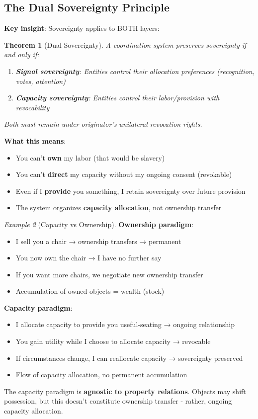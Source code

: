 \documentclass[11pt,a4paper]{article}
\newtheorem{theorem}{Theorem}[section]
\theoremstyle{definition}
\theoremstyle{remark}
\newtheorem{example}[theorem]{Example}
\begin{document}
\subsection{The Dual Sovereignty Principle}

\textbf{Key insight}: Sovereignty applies to BOTH layers:

\begin{theorem}[Dual Sovereignty]
A coordination system preserves sovereignty if and only if:
\begin{enumerate}
\item \textbf{Signal sovereignty}: Entities control their allocation preferences (recognition, votes, attention)
\item \textbf{Capacity sovereignty}: Entities control their labor/provision with revocability
\end{enumerate}

Both must remain under originator's unilateral revocation rights.
\end{theorem}

\textbf{What this means}:
\begin{itemize}
\item You can't \textbf{own} my labor (that would be slavery)
\item You can't \textbf{direct} my capacity without my ongoing consent (revokable)
\item Even if I \textbf{provide} you something, I retain sovereignty over future provision
\item The system organizes \textbf{capacity allocation}, not ownership transfer
\end{itemize}

\begin{example}[Capacity vs Ownership]
\textbf{Ownership paradigm}:
\begin{itemize}
\item I sell you a chair → ownership transfers → permanent
\item You now own the chair → I have no further say
\item If you want more chairs, we negotiate new ownership transfer
\item Accumulation of owned objects = wealth (stock)
\end{itemize}

\textbf{Capacity paradigm}:
\begin{itemize}
\item I allocate capacity to provide you useful-seating → ongoing relationship
\item You gain utility while I choose to allocate capacity → revocable
\item If circumstances change, I can reallocate capacity → sovereignty preserved
\item Flow of capacity allocation, no permanent accumulation
\end{itemize}

The capacity paradigm is \textbf{agnostic to property relations}. Objects may shift possession, but this doesn't constitute ownership transfer - rather, ongoing capacity allocation.
\end{example}
\end{document}
